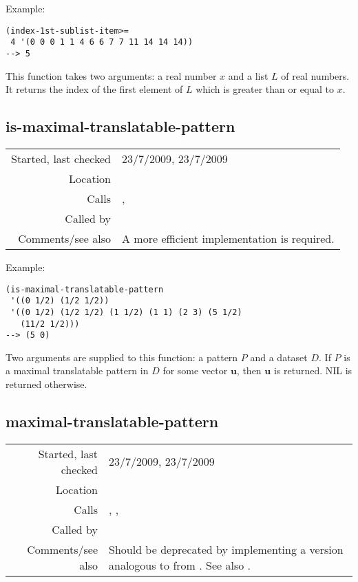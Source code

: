 \vspace{0.5cm}
\noindent Example:
\begin{verbatim}
(index-1st-sublist-item>=
 4 '(0 0 0 1 1 4 6 6 7 7 11 14 14 14))
--> 5
\end{verbatim}

\noindent This function takes two arguments: a real
number $x$ and a list $L$ of real numbers. It returns
the index of the first element of $L$ which is greater
than or equal to $x$.


\subsection*{is-maximal-translatable-pattern}\label{fun:is-maximal-translatable-pattern}

\vspace{0.3cm}
\begin{tabular}{r|p{8cm}}
Started, last checked & 23/7/2009, 23/7/2009 \\
Location & \nameref{sec:projection} \\
Calls & \nameref{fun:difference-list}, \nameref{fun:maximal-translatable-pattern} \\
Called by & \\
Comments/see also & A more efficient implementation is required.
\end{tabular}

\vspace{0.5cm}
\noindent Example:
\begin{verbatim}
(is-maximal-translatable-pattern
 '((0 1/2) (1/2 1/2))
 '((0 1/2) (1/2 1/2) (1 1/2) (1 1) (2 3) (5 1/2)
   (11/2 1/2)))
--> (5 0)
\end{verbatim}

\noindent Two arguments are supplied to this function:
a pattern $P$ and a dataset $D$. If $P$ is a maximal
translatable pattern in $D$ for some vector
$\mathbf{u}$, then $\mathbf{u}$ is returned. NIL is
returned otherwise.


\subsection*{maximal-translatable-pattern}\label{fun:maximal-translatable-pattern}

\vspace{0.3cm}
\begin{tabular}{r|p{8cm}}
Started, last checked & 23/7/2009, 23/7/2009 \\
Location & \nameref{sec:projection} \\
Calls & \nameref{fun:add-two-lists}, \nameref{fun:subtract-two-lists}, \nameref{fun:vector<vector} \\
Called by & \nameref{fun:is-maximal-translatable-pattern} \\
Comments/see also & Should be deprecated by implementing a version analogous to \nameref{fun:translators-of-pattern-in-dataset} from \citet{ukkonen2003}. See also \nameref{fun:maximal-translatable-pattern-mod-2nd-n}.
\end{tabular}

